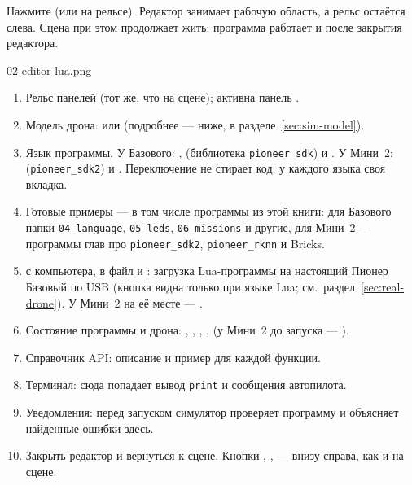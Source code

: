 Нажмите  (или  на рельсе). Редактор занимает рабочую область, а рельс остаётся слева. Сцена при этом продолжает жить: программа работает и после закрытия редактора.

\begin{shotcallouts}{02-editor-lua.png}
\end{shotcallouts}

\begin{enumerate}[label=\bubble{\arabic*}]
    \item Рельс панелей (тот же, что на сцене); активна панель .
    \item Модель дрона:  или  (подробнее --- ниже, в разделе~\ref{sec:sim-model}).
    \item Язык программы. У Базового: ,  (библиотека \texttt{pioneer\_sdk}) и . У Мини~2:  (\texttt{pioneer\_sdk2}) и . Переключение не стирает код: у каждого языка своя вкладка.
    \item Готовые примеры --- в том числе программы из этой книги: для Базового папки \texttt{04\_language}, \texttt{05\_leds}, \texttt{06\_missions} и другие, для Мини~2 --- программы глав про \texttt{pioneer\_sdk2}, \texttt{pioneer\_rknn} и Bricks.
    \item {} с компьютера,  в файл и : загрузка Lua-программы на настоящий Пионер Базовый по USB (кнопка видна только при языке Lua; см.\ раздел~\ref{sec:real-drone}). У Мини~2 на её месте --- .
    \item Состояние программы и дрона: , , , ,  (у Мини~2 до запуска --- ).
    \item Справочник API: описание и пример для каждой функции.
    \item Терминал: сюда попадает вывод \texttt{print} и сообщения автопилота.
    \item Уведомления: перед запуском симулятор проверяет программу и объясняет найденные ошибки здесь.
    \item Закрыть редактор и вернуться к сцене. Кнопки , ,  --- внизу справа, как и на сцене.
\end{enumerate}


